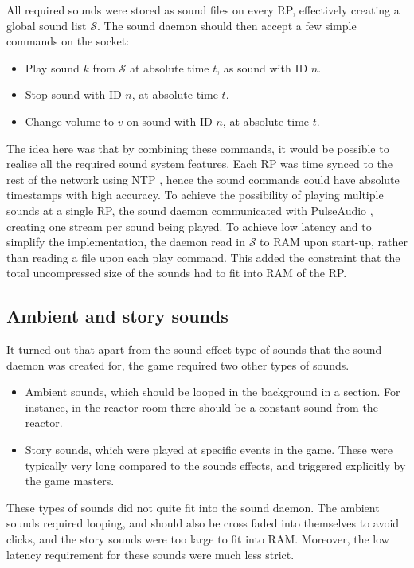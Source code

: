 All required sounds were stored as sound files on every RP,
effectively creating a global sound list $\mathcal{S}$. The sound
daemon should then accept a few simple commands on the socket:
\begin{itemize}
\item Play sound $k$ from $\mathcal{S}$ at absolute time $t$, as sound with ID $n$.
\item Stop sound with ID $n$, at absolute time $t$.
\item Change volume to $v$ on sound with ID $n$, at absolute time $t$.
\end{itemize}

The idea here was that by combining these commands, it would be
possible to realise all the required sound system features. Each RP was time
synced to the rest of the network using NTP \cite{ntp}, hence the
sound commands could have absolute timestamps with high accuracy. To
achieve the possibility of playing multiple sounds at a single RP, the
sound daemon communicated with PulseAudio \cite{pulseaudio}, creating
one stream per sound being played. To achieve low latency and to
simplify the implementation, the daemon read in $\mathcal{S}$ to RAM
upon start-up, rather than reading a file upon each play command. This
added the constraint that the total uncompressed size of the sounds
had to fit into RAM of the RP.

\subsection{Ambient and story sounds}

It turned out that apart from the sound effect type of sounds that
the sound daemon was created for, the game required two other types of sounds.
\begin{itemize}
\item Ambient sounds, which should be looped in the background in a section. For instance, in the reactor room there should be a constant sound from the reactor.
\item Story sounds, which were played at specific events in the game. These were typically very long compared to the sounds effects, and triggered explicitly by the game masters.
\end{itemize}

These types of sounds did not quite fit into the sound daemon. The
ambient sounds required looping, and should also be cross faded into
themselves to avoid clicks, and the story sounds were too large to fit
into RAM. Moreover, the low latency requirement for these
sounds were much less strict.


